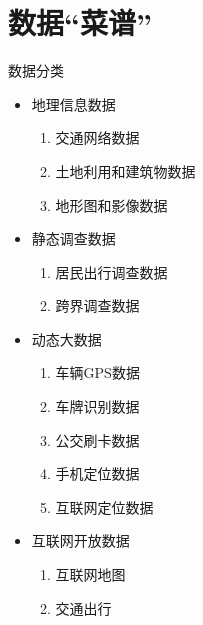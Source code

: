 

\section{数据``菜谱''}

\begin{frame}{数据分类}
\begin{itemize}
\item<1-> 地理信息数据
   \begin{enumerate}
     \item 交通网络数据
     \item 土地利用和建筑物数据
     \item 地形图和影像数据
  \end{enumerate}
\item<2-> 静态调查数据
   \begin{enumerate}
     \item 居民出行调查数据
     \item 跨界调查数据
   \end{enumerate}
\item<3-> 动态大数据
   \begin{enumerate}       
       \item 车辆GPS数据
       \item 车牌识别数据
       \item 公交刷卡数据
       \item 手机定位数据
       \item 互联网定位数据
   \end{enumerate}
\item<4-> 互联网开放数据
   \begin{enumerate}
     \item 互联网地图
     \item 交通出行
  \end{enumerate}
\end{itemize}
\end{frame}

